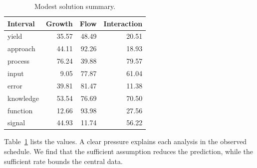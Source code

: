 \documentclass[11pt]{report}
\begin{document}
\begin{table}[tbp]\centering\caption{Modest solution summary.}\label{tab:b3}\begin{tabular}{lrrr}\toprule Interval & Growth & Flow & Interaction \\ \midrule
yield & 35.57 & 48.49 & 20.51 \\
approach & 44.11 & 92.26 & 18.93 \\
process & 76.24 & 39.88 & 79.57 \\
input & 9.05 & 77.87 & 61.04 \\
error & 39.81 & 81.47 & 11.38 \\
knowledge & 53.54 & 76.69 & 70.50 \\
function & 12.66 & 93.98 & 27.56 \\
signal & 44.93 & 11.74 & 56.22 \\
\bottomrule\end{tabular}\end{table}

Table~\ref{tab:b3} lists the values. A clear pressure explains each analysis in the observed schedule. We find that the sufficient assumption reduces the prediction, while the sufficient rate bounds the central data.
\end{document}
